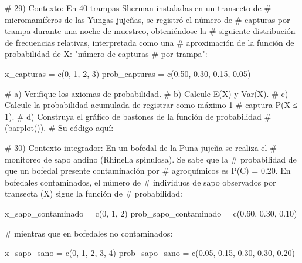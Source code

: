 \documentclass[
  spanish,
  letterpaper,
  DIV=11,
  numbers=noendperiod]{scrreprt}
\newenvironment{Shaded}{\begin{snugshade}}{\end{snugshade}}
\newcommand{\CommentTok}[1]{\textcolor[rgb]{0.37,0.37,0.37}{#1}}
\newcommand{\DecValTok}[1]{\textcolor[rgb]{0.68,0.00,0.00}{#1}}
\newcommand{\FloatTok}[1]{\textcolor[rgb]{0.68,0.00,0.00}{#1}}
\newcommand{\FunctionTok}[1]{\textcolor[rgb]{0.28,0.35,0.67}{#1}}
\newcommand{\NormalTok}[1]{\textcolor[rgb]{0.00,0.23,0.31}{#1}}
\newcommand{\OtherTok}[1]{\textcolor[rgb]{0.00,0.23,0.31}{#1}}
\begin{document}
\begin{Shaded}
\begin{Highlighting}[]
\CommentTok{\# 29) Contexto: En 40 trampas Sherman instaladas en un transecto de}
\CommentTok{\#     micromamíferos de las Yungas jujeñas, se registró el número de}
\CommentTok{\#     capturas por trampa durante una noche de muestreo, obteniéndose la}
\CommentTok{\#     siguiente distribución de frecuencias relativas, interpretada como una}
\CommentTok{\#     aproximación de la función de probabilidad de X: "número de capturas}
\CommentTok{\#     por trampa":}

\NormalTok{x\_capturas }\OtherTok{=} \FunctionTok{c}\NormalTok{(}\DecValTok{0}\NormalTok{, }\DecValTok{1}\NormalTok{, }\DecValTok{2}\NormalTok{, }\DecValTok{3}\NormalTok{)}
\NormalTok{prob\_capturas }\OtherTok{=} \FunctionTok{c}\NormalTok{(}\FloatTok{0.50}\NormalTok{, }\FloatTok{0.30}\NormalTok{, }\FloatTok{0.15}\NormalTok{, }\FloatTok{0.05}\NormalTok{)}

\CommentTok{\#     a) Verifique los axiomas de probabilidad.}
\CommentTok{\#     b) Calcule E(X) y Var(X).}
\CommentTok{\#     c) Calcule la probabilidad acumulada de registrar como máximo 1}
\CommentTok{\#        captura P(X ≤ 1).}
\CommentTok{\#     d) Construya el gráfico de bastones de la función de probabilidad}
\CommentTok{\#        (barplot()).}
\CommentTok{\# Su código aquí:}


\CommentTok{\# 30) Contexto integrador: En un bofedal de la Puna jujeña se realiza el}
\CommentTok{\#     monitoreo de sapo andino (Rhinella spinulosa). Se sabe que la}
\CommentTok{\#     probabilidad de que un bofedal presente contaminación por}
\CommentTok{\#     agroquímicos es P(C) = 0.20. En bofedales contaminados, el número de}
\CommentTok{\#     individuos de sapo observados por transecta (X) sigue la función de}
\CommentTok{\#     probabilidad:}

\NormalTok{x\_sapo\_contaminado }\OtherTok{=} \FunctionTok{c}\NormalTok{(}\DecValTok{0}\NormalTok{, }\DecValTok{1}\NormalTok{, }\DecValTok{2}\NormalTok{)}
\NormalTok{prob\_sapo\_contaminado }\OtherTok{=} \FunctionTok{c}\NormalTok{(}\FloatTok{0.60}\NormalTok{, }\FloatTok{0.30}\NormalTok{, }\FloatTok{0.10}\NormalTok{)}

\CommentTok{\#     mientras que en bofedales no contaminados:}

\NormalTok{x\_sapo\_sano }\OtherTok{=} \FunctionTok{c}\NormalTok{(}\DecValTok{0}\NormalTok{, }\DecValTok{1}\NormalTok{, }\DecValTok{2}\NormalTok{, }\DecValTok{3}\NormalTok{, }\DecValTok{4}\NormalTok{)}
\NormalTok{prob\_sapo\_sano }\OtherTok{=} \FunctionTok{c}\NormalTok{(}\FloatTok{0.05}\NormalTok{, }\FloatTok{0.15}\NormalTok{, }\FloatTok{0.30}\NormalTok{, }\FloatTok{0.30}\NormalTok{, }\FloatTok{0.20}\NormalTok{)}


\end{Highlighting}
\end{Shaded}
\end{document}
